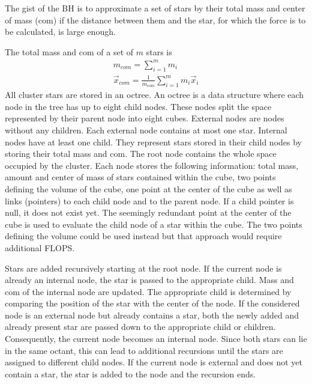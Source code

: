 \documentclass[letterpaper,10pt,english]{sphinxmanual}
\begin{document}
\sphinxAtStartPar
The gist of the BH is to approximate a set of stars by their total mass and center of mass (com) if the distance between them
and the star, for which the force is to be calculated, is large enough.

\sphinxAtStartPar
The total mass and com of a set of \(m\) stars is
\begin{equation*}
\begin{split}m_{com} = \sum_{i=1}^mm_i \\
\vec{x}_{com} = \frac{1}{m_{com}}\sum_{i=1}^mm_i\vec{x}_i\end{split}
\end{equation*}
\sphinxAtStartPar
All cluster stars are stored in an octree.
An octree is a data structure where each node in the tree has up to eight child nodes.
These nodes split the space represented by their parent node into eight cubes.
External nodes are nodes without any children. Each external node contains at most one star.
Internal nodes have at least one child. They represent stars stored in their child nodes by storing their total mass and com.
The root node contains the whole space occupied by the cluster. Each node stores the following information: total mass, amount and center of mass of stars
contained within the cube, two points defining the volume of the cube, one point at the center of the cube as well as links (pointers) to each child node and to the parent node.
If a child pointer is null, it does not exist yet.
The seemingly redundant point at the center of the cube is used to evaluate the child node of a star within the cube.
The two points defining the volume could be used instead but that approach would require additional FLOPS.

\sphinxAtStartPar
Stars are added recursively starting at the root node. If the current node is already an internal node, the star is passed
to the appropriate child. Mass and com of the internal node are updated.
The appropriate child is determined by comparing the position of the star with the center of the node.
If the considered node is an external node but already contains a star,
both the newly added and already present star are passed down to the appropriate child or children.
Consequently, the current node becomes an internal node.
Since both stars can lie in the same octant, this can lead to additional recursions until the stars are assigned to different child nodes.
If the current node is external and does not yet contain a star, the star is added to the node and the recursion ends.
\end{document}
